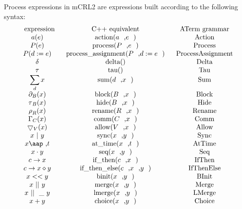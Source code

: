 \documentclass{article}
\begin{document}
Process expressions in mCRL2 are expressions built according to the
following syntax:%
\[
\begin{array}{ccc}
\text{expression} & \text{C++ equivalent} & \text{ATerm grammar} \\ 
a(e) & \text{action(}a\text{,}e\text{)} & \text{Action} \\ 
P(e) & \text{process(}P\text{,}e\text{)} & \text{Process} \\ 
P(d:=e) & \text{process\_assignment(}P\text{,}d:=e\text{)} & \text{%
ProcessAssignment} \\ 
\delta  & \text{delta()} & \text{Delta} \\ 
\tau  & \text{tau()} & \text{Tau} \\ 
\dsum\limits_{d}x & \text{sum(}d\text{,}x\text{)} & \text{Sum} \\ 
\partial _{B}(x) & \text{block(}B\text{,}x\text{)} & \text{Block} \\ 
\tau _{B}(x) & \text{hide(}B\text{,}x\text{)} & \text{Hide} \\ 
\rho _{R}(x) & \text{rename(}R\text{,}x\text{)} & \text{Rename} \\ 
\Gamma _{C}(x) & \text{comm(}C\text{,}x\text{)} & \text{Comm} \\ 
\bigtriangledown _{V}(x) & \text{allow(}V\text{,}x\text{)} & \text{Allow} \\ 
x\ |\ y & \text{sync(}x\text{,}y\text{)} & \text{Sync} \\ 
x\mbox{\aap ,}t & \text{at\_time(}x\text{,}t\text{)} & \text{AtTime} \\ 
x\cdot y & \text{seq(}x\text{,}y\text{)} & \text{Seq} \\ 
c\rightarrow x & \text{if\_then(}c\text{,}x\text{)} & \text{IfThen} \\ 
c\rightarrow x\diamond y & \text{if\_then\_else(}c\text{,}x\text{,}y\text{)}
& \text{IfThenElse} \\ 
x<<y & \text{binit(}x\text{,}y\text{)} & \text{BInit} \\ 
x\ ||\ y & \text{merge(}x\text{,}y\text{)} & \text{Merge} \\ 
x\ ||\_\ y & \text{lmerge(}x\text{,}y\text{)} & \text{LMerge} \\ 
x+y & \text{choice(}x\text{,}y\text{)} & \text{Choice}%
\end{array}%
\]
\end{document}
